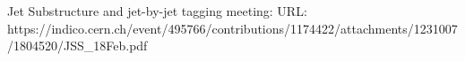 \documentclass[UKenglish,texlive=2013]{\ATLASLATEXPATH atlasdoc}
\begin{document}
\begin{thebibliography}{9}
%
%
%
%
%
%

Jet Substructure and jet-by-jet tagging meeting:
URL: https://indico.cern.ch/event/495766/contributions/1174422/attachments/1231007/1804520/JSS\_18Feb.pdf

\end{thebibliography}
\printbibliography
%
%


\clearpage
\appendix


\end{document}
